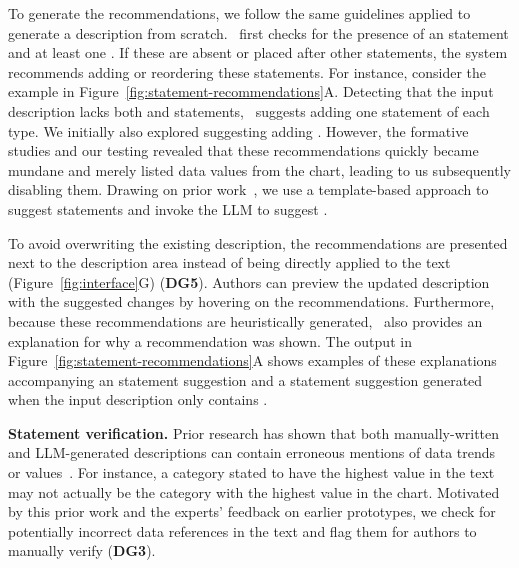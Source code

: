 {To generate the recommendations, we follow the same guidelines applied to generate a description from scratch. \pluto~first checks for the presence of an  statement and at least one .
If these are absent or placed after other statements, the system recommends adding or reordering these statements.
For instance, consider the example in Figure~\ref{fig:statement-recommendations}A.
Detecting that the input description lacks both  and  statements, \pluto~suggests adding one statement of each type.
We initially also explored suggesting adding .
However, the formative studies and our testing revealed that these recommendations quickly became mundane and merely listed data values from the chart, leading to us subsequently disabling them.
Drawing on prior work~\cite{tang2023vistext}, we use a template-based approach to suggest  statements and invoke the LLM to suggest .

To avoid overwriting the existing description, the recommendations are presented next to the description area instead of being directly applied to the text (Figure~\ref{fig:interface}G) (\textbf{DG5}).
Authors can preview the updated description with the suggested changes by hovering on the recommendations.
Furthermore, because these recommendations are heuristically generated, \pluto~also provides an explanation for why a recommendation was shown.
The output in Figure~\ref{fig:statement-recommendations}A shows examples of these explanations accompanying an  statement suggestion and a  statement suggestion generated when the input description only contains .

\textbf{Statement verification.}
Prior research has shown that both manually-written and LLM-generated descriptions can contain erroneous mentions of data trends or values~\cite{kim2023emphasischecker,tang2023vistext}. For instance, a category stated to have the highest value in the text may not actually be the category with the highest value in the chart.
Motivated by this prior work and the experts' feedback on earlier prototypes, we check for potentially incorrect data references in the text and flag them for authors to manually verify (\textbf{DG3}).

}
